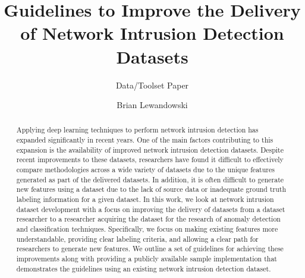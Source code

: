 \documentclass[sigconf, anonymous, screen]{acmart}
\begin{document}
\title{Guidelines to Improve the Delivery of Network Intrusion Detection Datasets}
\subtitle{Data/Toolset Paper}

\author{Brian Lewandowski}


\renewcommand{\shortauthors}{Lewandowski et al.}

\begin{abstract}
    Applying deep learning techniques to perform network intrusion detection has expanded significantly in recent years.
    One of the main factors contributing to this expansion is the availability of improved network intrusion detection datasets.
    Despite recent improvements to these datasets, researchers have found it difficult to effectively compare methodologies across a wide variety of datasets due to the unique features generated as part of the delivered datasets.
    In addition, it is often difficult to generate new features using a dataset due to the lack of source data or inadequate ground truth labeling information for a given dataset.
    In this work, we look at network intrusion dataset development with a focus on improving the delivery of datasets from a dataset researcher to a researcher acquiring the dataset for the research of anomaly detection and classification techniques.
    Specifically, we focus on making existing features more understandable, providing clear labeling criteria, and allowing a clear path for researchers to generate new features.
    We outline a set of guidelines for achieving these improvements along with providing a publicly available sample implementation that demonstrates the guidelines using an existing network intrusion detection dataset.
\end{abstract}
\end{document}
